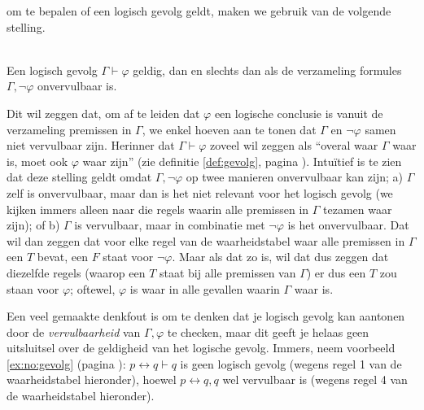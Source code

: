  om te bepalen of een logisch gevolg geldt, maken we gebruik van de volgende stelling.
\begin{theorem}\mbox{}\label{th:gevolg}\\
Een logisch gevolg $\Gamma\vdash \varphi$ geldig, dan en slechts dan als de verzameling formules $\Gamma,\neg \varphi$ onvervulbaar is.
\end{theorem}
Dit wil zeggen dat, om af te leiden dat $\varphi$ een logische conclusie is vanuit de verzameling premissen in $\Gamma$, we enkel hoeven aan te tonen dat $\Gamma$ en $\neg \varphi$ samen niet vervulbaar zijn. Herinner dat $\Gamma\vdash \varphi$ zoveel wil zeggen als ``overal waar $\Gamma$ waar is, moet ook $\varphi$ waar zijn'' (zie definitie \ref{def:gevolg}, pagina \pageref{def:gevolg}). Intu\"itief is te zien dat deze stelling geldt omdat $\Gamma, \neg \varphi$ op twee manieren onvervulbaar kan zijn; a) $\Gamma$ zelf is onvervulbaar, maar dan is het niet relevant voor het logisch gevolg (we kijken immers alleen naar die regels waarin alle premissen in $\Gamma$ tezamen waar zijn); of b) $\Gamma$ is vervulbaar, maar in combinatie met $\neg \varphi$ is het onvervulbaar. Dat wil dan zeggen dat voor elke regel van de waarheidstabel waar alle premissen in $\Gamma$ een $T$ bevat, een $F$ staat voor $\neg\varphi$. Maar als dat zo is, wil dat dus zeggen dat diezelfde regels (waarop een $T$ staat bij alle premissen van $\Gamma$) er dus een $T$ zou staan voor $\varphi$; oftewel, $\varphi$ is waar in alle gevallen waarin $\Gamma$ waar is.

Een veel gemaakte denkfout is om te denken dat je logisch gevolg kan aantonen door de \textit{vervulbaarheid} van $\Gamma,\varphi$ te checken, maar dit geeft je helaas geen uitsluitsel over de geldigheid van het logische gevolg. Immers, neem voorbeeld \ref{ex:no:gevolg} (pagina \pageref{ex:no:gevolg}): $p\leftrightarrow q\vdash q$ is geen logisch gevolg (wegens regel 1 van de waarheidstabel hieronder), hoewel $p\leftrightarrow q,q$ wel vervulbaar is (wegens regel 4 van de waarheidstabel hieronder).\\

